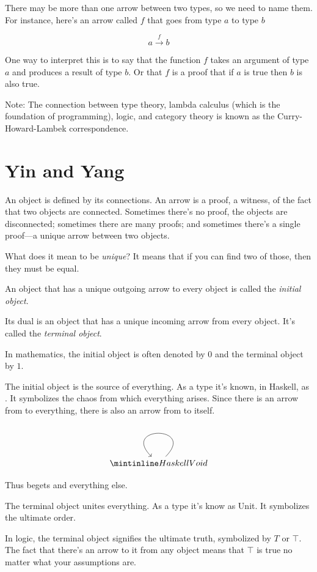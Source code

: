 \documentclass[DaoFP]{subfiles}
\begin{document}
There may be more than one arrow between two types, so we need to name them. For instance, here's an arrow called $f$ that goes from type $a$ to type $b$

\[ a \xrightarrow f b \]

One way to interpret this is to say that the function $ f$ takes an argument of type $a$ and produces a result of type $b$. Or that $ f$ is a proof that if $a$ is true then $b$ is also true.

Note: The connection between type theory, lambda calculus (which is the foundation of programming), logic, and category theory is known as the Curry-Howard-Lambek correspondence.

\section{Yin and Yang}

An object is defined by its connections. An arrow is a proof, a witness, of the fact that two objects are connected. Sometimes there's no proof, the objects are disconnected; sometimes there are many proofs; and sometimes there's a single proof---a unique arrow between two objects.

What does it mean to be \emph{unique}? It means that if you can find two of those, then they must be equal.

An object that has a unique outgoing arrow to every object is called the \emph{initial object}.

Its dual is an object that has a unique incoming arrow from every object. It's called the \emph{terminal object}. 

In mathematics, the initial object is often denoted by $0$ and the terminal object by $1$.

The initial object is the source of everything. As a type it's known, in Haskell, as . It symbolizes the chaos from which everything arises. Since there is an arrow from  to everything, there is also an arrow from  to itself. 

\[
 \begin{tikzcd}
 \hask{Void}
 \arrow[loop]
 \end{tikzcd}
\]

Thus  begets  and everything else.

The terminal object unites everything. As a type it's know as Unit. It symbolizes the ultimate order.

In logic, the terminal object signifies the ultimate truth, symbolized by $T$ or $ \top$. The fact that there's an arrow to it from any object means that $ \top$ is true no matter what your assumptions are. 
\end{document}
